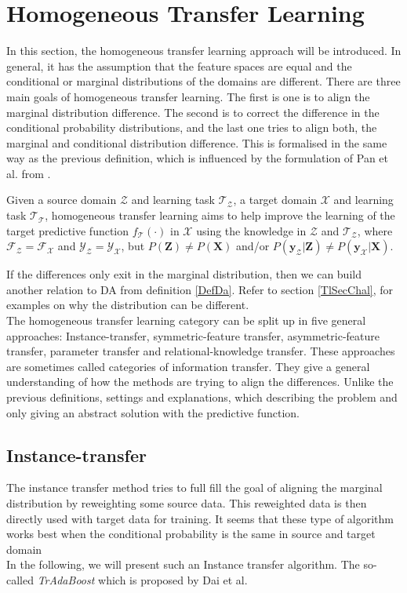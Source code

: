 \section{Homogeneous Transfer Learning}\label{TlSecHomo}
In this section, the homogeneous transfer learning approach will be introduced.
In general, it has the assumption that the feature spaces are equal and the conditional or marginal distributions of the domains are different.
There are three main goals of homogeneous transfer learning.
The first is one is to align the marginal distribution difference.
The second is to correct the difference in the conditional probability distributions, and the last one tries to align both, the marginal and conditional distribution difference.\cite[p. 6]{Weiss.2016}
This is formalised in the same way as the previous definition, which is influenced by the formulation of Pan et al. from \cite{Pan.2010}.
\begin{mDef}\label{DefHomogeneous}
	Given a source domain $\mathcal{Z}$ and learning task $\mathcal{T_Z}$, a target domain $\mathcal{X}$ and learning task $\mathcal{T_T}$, homogeneous transfer learning aims to help improve the learning of the target predictive function $f_\mathcal{T}(\cdot)$ in $\mathcal{X}$ using the knowledge in $\mathcal{Z}$ and $\mathcal{T_Z}$, where $\mathcal{F_Z} = \mathcal{F_X}$ and $\mathcal{Y_Z} =\mathcal{Y_X} $, but $P(\mathbf{Z}) \neq P(\mathbf{X})$ and/or $P(\mathbf{y_\mathcal{Z}}\vert \mathbf{Z}) \neq P(\mathbf{y_\mathcal{X}}\vert \mathbf{X})$.\cite[p. 4]{Weiss.2016}
\end{mDef}
If the differences only exit in the marginal distribution, then we can build another relation to \acl{DA} from definition \ref{DefDa}.
Refer to section \ref{TlSecChal}, for examples on why the distribution can be different.\cite[p. 6-7]{Weiss.2016}\\ 
The homogeneous transfer learning category can be split up in five general approaches:
Instance-transfer, symmetric-feature transfer, asymmetric-feature transfer, parameter transfer and relational-knowledge transfer.
These approaches are sometimes called categories of information transfer.
They give a general understanding of how the methods are trying to align the differences.\cite[p. 6-7]{Weiss.2016}
Unlike the previous definitions, settings and explanations, which describing the problem and only giving an abstract solution with the predictive function.
\subsection{Instance-transfer}\label{TlSubSecInstance}
The instance transfer method tries to full fill the goal of aligning the marginal distribution by reweighting some source data.
This reweighted data is then directly used with target data for training.
It seems that these type of algorithm works best when the conditional probability is the same in source and target domain \cite[p. 6]{Weiss.2016}\\
In the following, we will present such an Instance transfer algorithm.
The so-called \textit{TrAdaBoost} which is proposed by Dai et al.\cite{Pan.2010}\\
